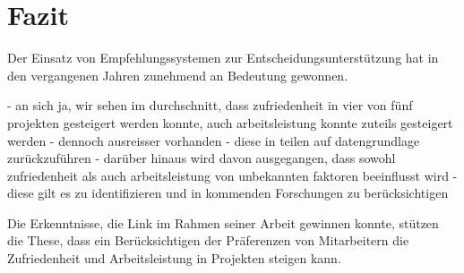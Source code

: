 
\chapter{Fazit}
\label{ch:fazit}
Der Einsatz von Empfehlungssystemen zur Entscheidungsunterstützung hat in den vergangenen Jahren zunehmend an Bedeutung gewonnen.


- an sich ja, wir sehen im durchschnitt, dass zufriedenheit in vier von fünf projekten gesteigert werden konnte, auch arbeitsleistung konnte zuteils gesteigert werden
- dennoch ausreisser vorhanden
- diese in teilen auf datengrundlage zurückzuführen
- darüber hinaus wird davon ausgegangen, dass sowohl zufriedenheit als auch arbeitsleistung von unbekannten faktoren beeinflusst wird
- diese gilt es zu identifizieren und in kommenden Forschungen zu berücksichtigen


Die Erkenntnisse, die Link im Rahmen seiner Arbeit gewinnen konnte, stützen die These, dass ein Berücksichtigen der Präferenzen von Mitarbeitern die Zufriedenheit und Arbeitsleistung in Projekten steigen kann.

